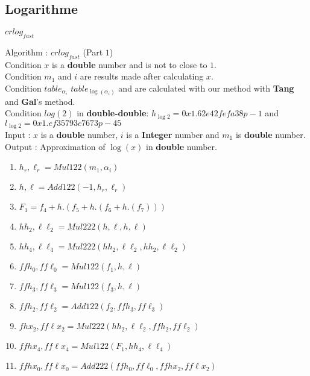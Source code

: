 \subsection{Logarithme}
\begin{frame}{$crlog_{fast}$}
  \tiny 
  \begin{algo}{Algorithm : \textbf{$crlog_{fast}$} (Part $1$)}\\
 Condition $x$ is a \textbf{double} number and is not to close to $1$.\\
Condition $m_1$ and $i$ are results made after calculating $x$.\\
Condition $table_{\alpha_{i}}$  $table_{\log(\alpha_{i})}$ and are calculated with our method with \textbf{Tang} and \textbf{Gal}'s method.\\
Condition $log(2)$ in \textbf{double-double}: $h_{\log2} = 0x1.62e42fefa38p-1$ and $l_{\log2} = 0x1.ef35793c7673p-45$ \\
Input : $x$ is a \textbf{double} number, $i$ is a \textbf{Integer} number and $m_1$ is \textbf{double} number.\\
Output : Approximation of $\log(x)$ in \textbf{double} number.
 \begin{enumerate}
\item $h_r,\ell_r = Mul122(m_1, \alpha_i )$
\item $h,\ell = Add122(-1,h_r,\ell_r)$
\item $F_1 = f_4 + h.(f_5 + h.(f_6+ h.(f_7)))$
\item $hh_2,\ell\ell_2 = Mul222(h,\ell,h,\ell)$\\
\item $hh_4,\ell\ell_4 = Mul222(hh_2,\ell\ell_2,hh_2,\ell\ell_2)$\\
\item $ffh_0,ff\ell_0 = Mul122(f_1,h,\ell)$\\
\item $ffh_3,ff\ell_3 = Mul122(f_3,h,\ell)$\\
\item $ffh_2,ff\ell_2 = Add122(f_2,ffh_3,ff\ell_3)$\\
\item $fhx_2,ff\ell x_2 = Mul222(hh_2,\ell\ell_2,ffh_2,ff\ell_2)$\\
\item$ffhx_4,ff\ell x_4 = Mul122(F_1,hh_4,\ell\ell_4)$\\
\item$ffhx_0,ff\ell x_0 = Add222(ffh_0, ff\ell_0, ffhx_2, ff\ell x_2)$\\
\end{enumerate}
\end{algo}
\end{frame}
